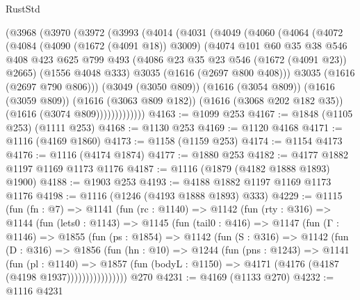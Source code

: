 \begin{lexlean}{RustStd}
\begin{coremodule}
{\begin{coremodule}
{{{{{{{{{{{      (@3968
        (@3970
          (@3972
            (@3993
              (@4014
                (@4031
                  (@4049
                    (@4060
                      (@4064
                        (@4072
                          (@4084
                            (@4090 (@1672 (@4091 @18)) @3009)
                            (@4074
                              @101
                              @60
                              @35
                              @38
                              @546
                              @408
                              @423
                              @625
                              @799
                              @493
                              (@4086 @23 @35 @23 @546 (@1672 (@4091 @23)) @2665)
                              (@1556 @4048 @333)
                              @3035
                              (@1616 (@2697 @800 @408)))
                            @3035
                            (@1616 (@2697 @790 @806)))
                          (@3049 (@3050 @809))
                          (@1616 (@3054 @809))
                          (@1616 (@3059 @809))
                          (@1616 (@3063 @809 @182))
                          (@1616 (@3068 @202 @182 @35))
                          (@1616 (@3074 @809)))))))))))))
@4163 := @1099 @253
@4167 := @1848 (@1105 @253) (@1111 @253)
@4168 := @1130 @253
@4169 := @1120 @4168
@4171 := @1116 (@4169 @1860)
@4173 := @1158 (@1159 @253)
@4174 := @1154 @4173
@4176 := @1116 (@4174 @1874)
@4177 := @1880 @253
@4182 := @4177 @1882 @1197 @1169 @1173 @1176
@4187 := @1116 (@1879 (@4182 @1888 @1893) @1900)
@4188 := @1903 @253
@4193 := @4188 @1882 @1197 @1169 @1173 @1176
@4198 := @1116 (@1246 (@4193 @1888 @1893) @333)
@4229 := @1115
    (fun (fn : @7) =>
    @1141
      (fun (rc : @1140) =>
      @1142
        (fun (rty : @316) =>
        @1144
          (fun (lets0 : @1143) =>
          @1145
            (fun (tail0 : @416) =>
            @1147
              (fun (Γ : @1146) =>
              @1855
                (fun (ps : @1854) =>
                @1142
                  (fun (S : @316) =>
                  @1142
                    (fun (D : @316) =>
                    @1856
                      (fun (hn : @10) =>
                      @1244
                        (fun (pns : @1243) =>
                        @1141
                          (fun (pl : @1140) =>
                          @1857
                            (fun (bodyL : @1150) => @4171 (@4176 (@4187 (@4198 @1937))))))))))))))))
    @270
@4231 := @4169 (@1133 @270)
@4232 := @1116 @4231
}}}}}}}}}}}
\end{coremodule}}
\end{coremodule}
\end{lexlean}
